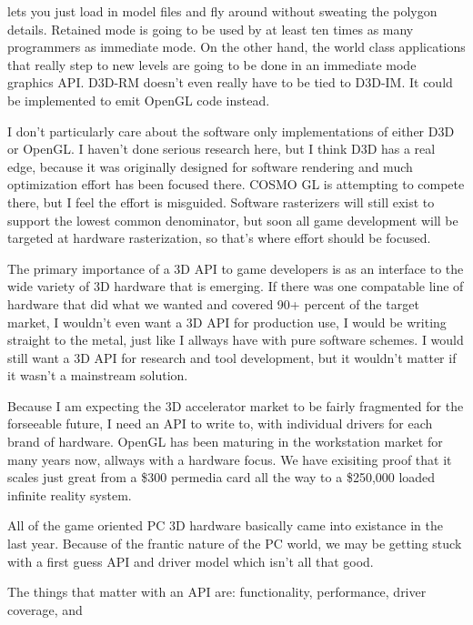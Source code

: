 \begin{allintypewriter}
lets you just load in model files and fly around without sweating the polygon details. 
Retained mode is going to be used by at least ten times as many programmers as 
immediate mode. On the other hand, the world class applications that really step to new 
levels are going to be done in an immediate mode graphics API. D3D-RM doesn't even really 
have to be tied to D3D-IM. It could be implemented to emit OpenGL code instead.\\ 
\par
I don't particularly care about the software only implementations of either D3D or OpenGL. 
I haven't done serious research here, but I think D3D has a real edge, because it was 
originally designed for software rendering and much optimization effort has been focused 
there. COSMO GL is attempting to compete there, but I feel the effort is misguided. 
Software rasterizers will still exist to support the lowest common denominator, but soon 
all game development will be targeted at hardware rasterization, so that's where effort 
should be focused.\\ 
\par
The primary importance of a 3D API to game developers is as an interface to the wide 
variety of 3D hardware that is emerging. If there was one compatable line of hardware 
that did what we wanted and covered 90+ percent of the target market, I wouldn't even 
want a 3D API for production use, I would be writing straight to the metal, just like 
I allways have with pure software schemes. I would still want a 3D API for research and 
tool development, but it wouldn't matter if it wasn't a mainstream solution.\\ 
\par
Because I am expecting the 3D accelerator market to be fairly fragmented for the 
forseeable future, I need an API to write to, with individual drivers for each brand of 
hardware. OpenGL has been maturing in the workstation market for many years now, allways 
with a hardware focus. We have exisiting proof that it scales just great from a \$300 
permedia card all the way to a \$250,000 loaded infinite reality system.\\ 
\par
All of the game oriented PC 3D hardware basically came into existance in the last year. 
Because of the frantic nature of the PC world, we may be getting stuck with a first guess 
API and driver model which isn't all that good.\\ 
\par
The things that matter with an API are: functionality, performance, driver coverage, and

\end{allintypewriter}
